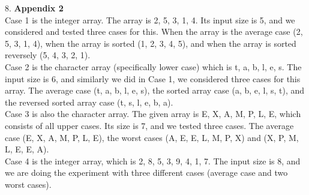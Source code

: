 \documentclass{article}
\begin{document}
8. \textbf{Appendix 2} \\
\indent Case 1 is the integer array. The array is 2, 5, 3, 1, 4. Its input size is 5, and we considered and tested three cases for this. When the array is the average case (2, 5, 3, 1, 4), when the array is sorted (1, 2, 3, 4, 5), and when the array is sorted reversely (5, 4, 3, 2, 1). \\
\indent Case 2 is the character array (specifically lower case) which is t, a, b, l, e, s. The input size is 6, and similarly we did in Case 1, we considered three cases for this array. The average case (t, a, b, l, e, s), the sorted array case (a, b, e, l, s, t), and the reversed sorted array case (t, s, l, e, b, a). \\
\indent Case 3 is also the character array. The given array is E, X, A, M, P, L, E, which consists of all upper cases. Its size is 7, and we tested three cases. The average case (E, X, A, M, P, L, E), the worst cases (A, E, E, L, M, P, X) and (X, P, M, L, E, E, A). \\
\indent Case 4 is the integer array, which is 2, 8, 5, 3, 9, 4, 1, 7. The input size is 8, and we are doing the experiment with three different cases (average case and two worst cases).  
\end{document}
